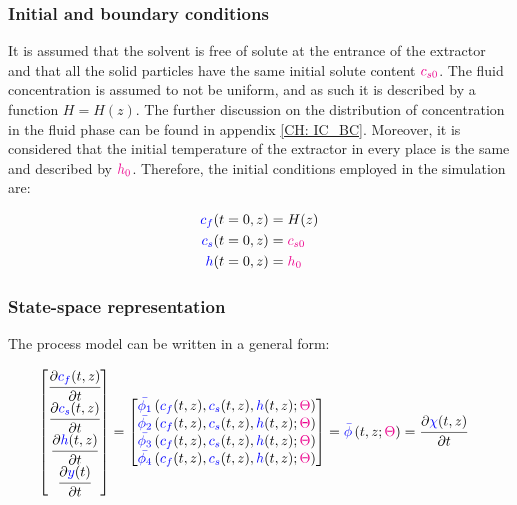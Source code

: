 \documentclass[../Article_Model_Parameters.tex]{subfiles}
\begin{document}
		\subsubsection{Initial and boundary conditions} 
		It is assumed that the solvent is free of solute at the entrance of the extractor and that all the solid particles have the same initial solute content ${\color{magenta}c_{s0}}$. The fluid concentration is assumed to not be uniform, and as such it is described by a function $H=H(z)$. The further discussion on the distribution of concentration in the fluid phase can be found in appendix \ref{CH: IC_BC}. Moreover, it is considered that the initial temperature of the extractor in every place is the same and described by ${\color{magenta}h_0}$. Therefore, the initial conditions employed in the simulation are:
			
		{\footnotesize
			\begin{subequations}
				\begin{align*}
					{\color{blue}c_f}(t = 0, z) &= H(z)   \\
					{\color{blue}c_s}(t = 0, z) &= {\color{magenta}c_{s0}} \\
					{\color{blue}h}(t = 0, z) &= {\color{magenta}h_0}
				\end{align*}
		\end{subequations} }
	
		\subsubsection{State-space representation} \label{CH: State_space}
			
		The process model can be written in a general form:
			
		{\footnotesize
			\begin{align}
				\begin{bmatrix}
					\cfrac{\partial {\color{blue}c_f}(t,z)}{\partial t}\\
					\cfrac{\partial {\color{blue}c_s}(t,z)}{\partial t}\\
					\cfrac{\partial {\color{blue}h}(t,z)}{\partial t} \\
					\cfrac{\partial {\color{blue}y}(t)}{\partial t} 
				\end{bmatrix}
				& =
				\begin{bmatrix}
					{\color{blue}\bar{\phi_1}} \left( {\color{blue}c_f}(t,z),{\color{blue}c_s}(t,z),{\color{blue}h}(t,z); {\color{magenta}\Theta} \right)\\
					{\color{blue}\bar{\phi_2}} \left( {\color{blue}c_f}(t,z),{\color{blue}c_s}(t,z),{\color{blue}h}(t,z); {\color{magenta}\Theta} \right)\\
					{\color{blue}\bar{\phi_3}} \left( {\color{blue}c_f}(t,z),{\color{blue}c_s}(t,z),{\color{blue}h}(t,z); {\color{magenta}\Theta} \right) \\
					{\color{blue}\bar{\phi_4}} \left( {\color{blue}c_f}(t,z),{\color{blue}c_s}(t,z),{\color{blue}h}(t,z); {\color{magenta}\Theta} \right)
				\end{bmatrix} = {\color{blue}\bar{\phi}} \left( t,z; {\color{magenta}\Theta} \right) = \cfrac{\partial {\color{blue}\chi}(t,z)}{\partial t}
		\end{align} }
			
\end{document}
